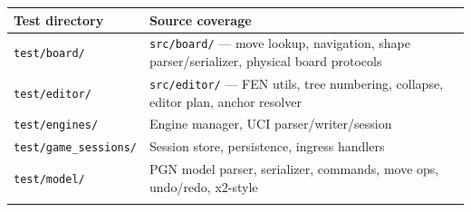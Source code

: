 \documentclass[]{article}
\begin{document}
\begin{longtable}[]{@{}ll@{}}
\toprule
\begin{minipage}[b]{0.05\columnwidth}\raggedright\strut
Test directory\strut
\end{minipage} & \begin{minipage}[b]{0.05\columnwidth}\raggedright\strut
Source coverage\strut
\end{minipage}\tabularnewline
\midrule
\endhead
\begin{minipage}[t]{0.05\columnwidth}\raggedright\strut
\texttt{test/board/}\strut
\end{minipage} & \begin{minipage}[t]{0.05\columnwidth}\raggedright\strut
\texttt{src/board/} --- move lookup, navigation, shape
parser/serializer, physical board protocols\strut
\end{minipage}\tabularnewline
\begin{minipage}[t]{0.05\columnwidth}\raggedright\strut
\texttt{test/editor/}\strut
\end{minipage} & \begin{minipage}[t]{0.05\columnwidth}\raggedright\strut
\texttt{src/editor/} --- FEN utils, tree numbering, collapse, editor
plan, anchor resolver\strut
\end{minipage}\tabularnewline
\begin{minipage}[t]{0.05\columnwidth}\raggedright\strut
\texttt{test/engines/}\strut
\end{minipage} & \begin{minipage}[t]{0.05\columnwidth}\raggedright\strut
Engine manager, UCI parser/writer/session\strut
\end{minipage}\tabularnewline
\begin{minipage}[t]{0.05\columnwidth}\raggedright\strut
\texttt{test/game\_sessions/}\strut
\end{minipage} & \begin{minipage}[t]{0.05\columnwidth}\raggedright\strut
Session store, persistence, ingress handlers\strut
\end{minipage}\tabularnewline
\begin{minipage}[t]{0.05\columnwidth}\raggedright\strut
\texttt{test/model/}\strut
\end{minipage} & \begin{minipage}[t]{0.05\columnwidth}\raggedright\strut
PGN model parser, serializer, commands, move ops, undo/redo,
x2-style\strut
\end{minipage}\tabularnewline
\begin{minipage}[t]{0.05\columnwidth}\raggedright\strut

\end{minipage}
\end{longtable}
\end{document}
